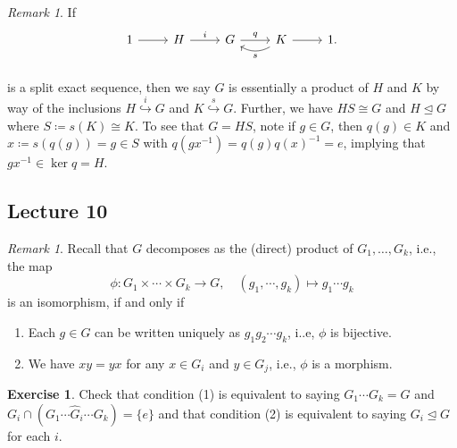 \documentclass[10pt,letterpaper,cm]{nupset}
\theoremstyle{definition}
\theoremstyle{theorem}
\newtheorem{exercise}[definition]{Exercise}
\theoremstyle{remark}
\newtheorem{remark}[definition]{Remark}
\newcommand{\1}{\mathbf{1}}
\newcommand{\0}{\vec 0}
\begin{document}
\begin{remark}
If  \[
	\begin{tikzcd}
	1\rar & H\rar["i" above] & G\rar["q" above] & K\rar\lar[bend left=30,"s" below] & 1. \\
	\end{tikzcd}
\]
is a split exact sequence, then we say $G$ is essentially a product of $H$ and $K$ by way of the inclusions $H \overset{i}{\hookrightarrow} G$ and $K \overset{s}{\hookrightarrow} G$. Further, we have $HS \cong G$ and $H \unlhd G$ where $S\coloneqq s(K) \cong K$. To see that $G = HS$, note if $g \in G$, then $q(g) \in K$ and $x\coloneqq  s(q(g)) = g \in S$ with $q(gx^{-1}) = q(g)q(x)^{-1} = e$, implying that $gx^{-1} \in \ker q = H$.
\end{remark}

\subsection{Lecture 10}

\begin{remark}
Recall that $G$ decomposes as the (direct) product of $G_1, \ldots, G_k$, i.e., the map $$\phi : G_1 \times \cdots \times G_k \to G, \quad  (g_1, \cdots, g_k) \mapsto g_1\cdots g_k$$ is an isomorphism, if and only if
\begin{enumerate}
\item Each $g\in G$ can be written uniquely as $g_1 g_2\cdots g_k$, i..e, $\phi$ is bijective.
\item We have $xy = yx$ for any $x \in G_i$ and $y\in G_j$, i.e., $\phi$ is a morphism.
\end{enumerate}
\end{remark}

\begin{exercise}
Check that condition (1) is equivalent to saying $G_1 \cdots G_k = G$ and $G_i \cap (G_1 \cdots \widehat{G}_i \cdots G_k) = \{e\}$ and that condition (2) is equivalent to saying $G_i \unlhd G$ for each $i$.
\end{exercise}
\end{document}
